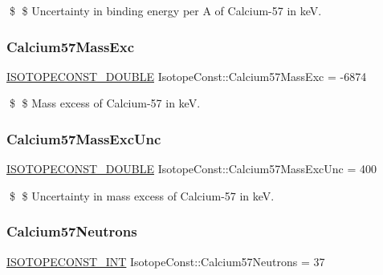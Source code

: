 \$ \$ Uncertainty in binding energy per A of Calcium-\/57 in keV. \mbox{\label{group___isotope_const-_calcium-_ca57_ga4e967462dc9d77238b58cc7e6f7112d1}} 
\subsubsection{\texorpdfstring{Calcium57\+Mass\+Exc}{Calcium57MassExc}}
{\footnotesize\ttfamily \mbox{\hyperlink{group___isotope_const-_macros_ga8f45a7272ce02c0b4c65c44636ed719a}{I\+S\+O\+T\+O\+P\+E\+C\+O\+N\+S\+T\+\_\+\+D\+O\+U\+B\+LE}} Isotope\+Const\+::\+Calcium57\+Mass\+Exc = -\/6874}

\$ \$ Mass excess of Calcium-\/57 in keV. \mbox{\label{group___isotope_const-_calcium-_ca57_ga1e7dacc5aa17ebd7445e5be1ec61ed2b}} 
\subsubsection{\texorpdfstring{Calcium57\+Mass\+Exc\+Unc}{Calcium57MassExcUnc}}
{\footnotesize\ttfamily \mbox{\hyperlink{group___isotope_const-_macros_ga8f45a7272ce02c0b4c65c44636ed719a}{I\+S\+O\+T\+O\+P\+E\+C\+O\+N\+S\+T\+\_\+\+D\+O\+U\+B\+LE}} Isotope\+Const\+::\+Calcium57\+Mass\+Exc\+Unc = 400}

\$ \$ Uncertainty in mass excess of Calcium-\/57 in keV. \mbox{\label{group___isotope_const-_calcium-_ca57_gab96e57bde9675c2721c1a42f5ab93e0e}} 
\subsubsection{\texorpdfstring{Calcium57\+Neutrons}{Calcium57Neutrons}}
{\footnotesize\ttfamily \mbox{\hyperlink{group___isotope_const-_macros_ga5f18360b3e99483a35c32d789e62621c}{I\+S\+O\+T\+O\+P\+E\+C\+O\+N\+S\+T\+\_\+\+I\+NT}} Isotope\+Const\+::\+Calcium57\+Neutrons = 37}


